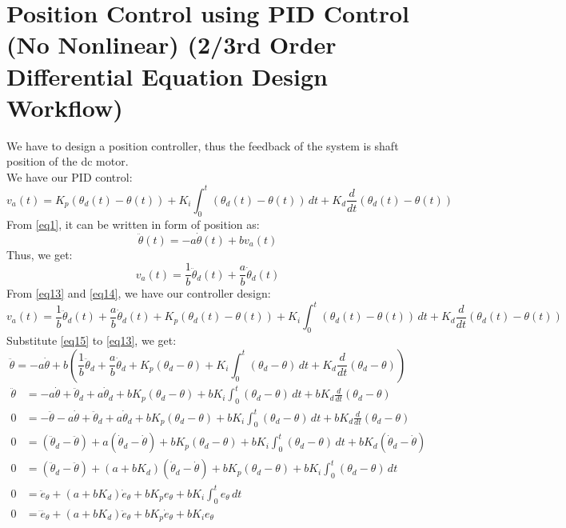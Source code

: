 \documentclass[12pt,a4paper]{article}
\begin{document}
	\section{Position Control using PID Control (No Nonlinear) (2/3rd Order Differential Equation Design Workflow)}
	We have to design a position controller, thus the feedback of the system is shaft position of the dc motor.\\
	We have our PID control:
	\begin{equation}
		\label{eq12}
		v_a(t) = K_p(\theta_d(t) - \theta(t)) + K_i \int_{0}^{t} (\theta_d(t) - \theta(t)) \,dt + K_d \frac{d}{dt} (\theta_d(t) - \theta(t))
	\end{equation}
	From \autoref{eq1}, it can be written in form of position as:
	\begin{equation}
		\label{eq13}
		\ddot{\theta}(t) = -a\dot{\theta}(t) + bv_a(t) 
	\end{equation}
	Thus, we get:
	\begin{equation}
		\label{eq14}
		v_a(t) = \frac{1}{b}\ddot{\theta}_d(t) + \frac{a}{b}\dot{\theta}_d(t)
	\end{equation}
	From \autoref{eq13} and \autoref{eq14}, we have our controller design:
	\begin{equation}
		\label{eq15}
		v_a(t) = \frac{1}{b}\ddot{\theta}_d(t) + \frac{a}{b}\dot{\theta}_d(t) + K_p(\theta_d(t) - \theta(t)) + K_i \int_{0}^{t} (\theta_d(t) - \theta(t)) \,dt + K_d \frac{d}{dt} (\theta_d(t) - \theta(t))
	\end{equation}
	Substitute \autoref{eq15} to \autoref{eq13}, we get:
	\begin{equation}
		\label{eq16}
		\ddot{\theta} = -a\dot{\theta} + b\left(\frac{1}{b}\ddot{\theta}_d + \frac{a}{b}\dot{\theta}_d + K_p(\theta_d - \theta) + K_i \int_{0}^{t} (\theta_d - \theta) \,dt + K_d \frac{d}{dt} (\theta_d - \theta)\right)
	\end{equation}
	\[
	\begin{split}
		\ddot{\theta} &= -a\dot{\theta} + \ddot{\theta}_d + a\dot{\theta}_d + bK_p(\theta_d - \theta) + bK_i \int_{0}^{t} (\theta_d - \theta) \,dt + bK_d \frac{d}{dt} (\theta_d - \theta) \\
		0 &= -\ddot{\theta} -a\dot{\theta} + \ddot{\theta}_d + a\dot{\theta}_d + bK_p(\theta_d - \theta) + bK_i \int_{0}^{t} (\theta_d - \theta) \,dt + bK_d \frac{d}{dt} (\theta_d - \theta) \\
		0 &= (\ddot{\theta}_d -\ddot{\theta}) +a(\dot{\theta}_d -\dot{\theta}) + bK_p(\theta_d - \theta) + bK_i \int_{0}^{t} (\theta_d - \theta) \,dt + bK_d (\dot{\theta}_d -\dot{\theta}) \\
		0 &= (\ddot{\theta}_d -\ddot{\theta}) +(a+bK_d)(\dot{\theta}_d -\dot{\theta}) + bK_p(\theta_d - \theta) + bK_i \int_{0}^{t} (\theta_d - \theta) \,dt \\
		0 &= \ddot{e}_{\theta} +(a+bK_d) \dot{e}_{\theta} + bK_pe_{\theta} + bK_i \int_{0}^{t} e_{\theta} \,dt \\
		0 &= \dddot{e}_{\theta} +(a+bK_d) \ddot{e}_{\theta} + bK_p\dot{e}_{\theta} + bK_ie_{\theta} \\
	\end{split}
	\]
\end{document}
